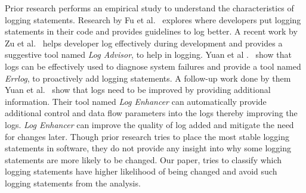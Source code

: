 Prior research performs an empirical study to understand the characteristics of logging statements. Research by Fu {et al$.$}~\cite{Fu1} explores where developers put logging statements in their code and provides guidelines to log better. A recent work by Zu {et al$.$}~\cite{ZhuIcse15} helps developer log effectively during development and provides a suggestive tool named \emph{Log Advisor}, to help in logging. Yuan {et al $.$}~\cite{Yuan_beconservative:} show that logs can be effectively used to diagnose system failures and provide a tool named \emph{Errlog}, to proactively add logging statements. A follow-up work done by them Yuan {et al$ . $}~\cite{Yuan} show that logs need to be improved by providing additional information. Their tool named \emph{Log Enhancer} can automatically provide additional control and data flow parameters into the logs thereby improving the logs. \emph{Log Enhancer} can improve the quality of log added and mitigate the need for changes later. Though prior research tries to place the most stable logging statements in software, they do not provide any insight into why some logging statements are more likely to be changed. Our paper, tries to classify which logging statements have higher likelihood of being changed and avoid such logging statements from the analysis.









